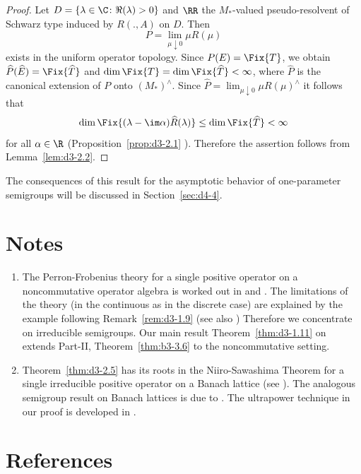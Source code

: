 \begin{proof}
Let $D = \{\lambda \in \C \colon \Re(\lambda) > 0\}$ and $\RR$ the $M_{*}$-valued pseudo-resolvent of Schwarz type induced by $R(.,A)$ on $D$.
Then
\[
	P = \lim_{\mu \downarrow 0}\mu R(\mu)
\]
exists in the uniform operator topology.
Since $ P(E) = \Fix{T} $, we obtain $ \widehat{P}(\widehat{E}) = \Fix{\widehat{T}} $ and 
$\dim \Fix{T} = \dim \Fix{\widehat{T}} < \infty$, where $\widehat{P}$ is the canonical extension of\/ $P$ onto $(M_{*})^{\wedge}$.
Since $\widehat{P} = \lim_{\mu \downarrow 0} \mu R(\mu)^{\wedge}$ it follows that
\[
\dim \Fix  {(\lambda - \im\alpha)\widehat{R}(\lambda)} \leq \dim \Fix{\widehat{T}} < \infty
\]
for all $\alpha \in \R$ (Proposition~\ref{prop:d3-2.1} ).
Therefore the assertion follows from Lemma~\ref{lem:d3-2.2}.
\end{proof} 
The consequences of this result for the asymptotic behavior of one-parameter semigroups will be discussed in Section~\ref{sec:d4-4}.
\section*{Notes}\label{notes:d3-notes}

\begin{enumerate}[label=\emph{Section \arabic*:}, wide, itemsep=1ex]

\item
The Perron-Frobenius theory for a single positive operator on a noncommutative operator algebra is worked out in \textcite{albeverio:1978} and \textcite{groh:1981}.
The limitations of the theory (in the continuous as in the discrete case)
are explained by the example following Remark~\ref{rem:d3-1.9} (see also \textcite{groh:1982a}) 
Therefore we concentrate on irreducible semigroups.
Our main result Theorem~\ref{thm:d3-1.11} on extends Part-II, Theorem~\ref{thm:b3-3.6} to the noncommutative setting.

\item
Theorem~\ref{thm:d3-2.5} has its roots in the Niiro-Sawashima Theorem for a single irreducible positive operator on a Banach lattice (see \textcite[V.5.4]{schaefer:1974}).
The analogous semigroup result on Banach lattices is due to \textcite{greiner:1982}.
The ultrapower technique in our proof is developed in \textcite{groh:1984b}. 

\end{enumerate}
\section*{References}
{\RaggedRight
  \printbibliography[heading=none]
 }

































